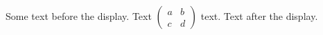 \documentclass[12pt]{article}
\begin{document}
Some text before the display.
Text $\left(\begin{smallmatrix} a & b \\ c & d \end{smallmatrix}\right)$ text.
Text after the display.
\end{document}
